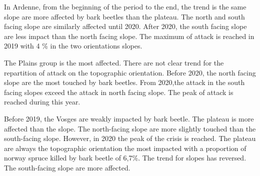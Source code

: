 \documentclass[3p,procedia]{elsarticle}
\begin{document}
In Ardenne, from the beginning of the period to the end, the trend is the same slope are more affected by bark beetles than the plateau. 
The north and south facing slope are similarly affected until 2020. 
After 2020, the south facing slope are less impact than the north facing slope. 
The maximum of attack is reached in 2019 with 4 \% in the two orientations slopes.

The Plains group is the most affected. 
There are not clear trend for the repartition of attack on the topographic orientation.
Before 2020, the north facing slope are the most touched by bark beetles.
From 2020,the attack in the south facing slopes exceed the attack in north facing slope. 
The peak of attack is reached during this year.

Before 2019, the Vosges are weakly impacted by bark beetle. 
The plateau is more affected than the slope.
The north-facing slope are more slightly touched than the south-facing slope. 
However, in 2020 the peak of the crisis is reached. 
The plateau are always the topographic orientation the most impacted with a proportion of norway spruce killed by bark beetle of 6,7\%.
The trend for slopes has reversed. 
The south-facing slope are more affected. 



  

 
 
\end{document}
